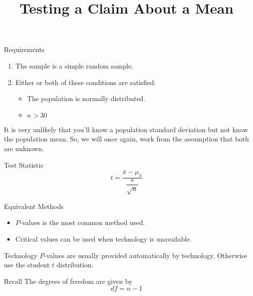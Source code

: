 \documentclass{beamer}
\title[MA205 - Section 8.3]{Testing a Claim About a Mean}
\begin{document}
\begin{frame}
\titlepage
\end{frame}

\begin{frame}
\begin{block}{Requirements}
\begin{enumerate}
\item The sample is a simple random sample.\pause
\item Either or both of these conditions are satisfied:
\begin{itemize}
\item The population is normally distributed.
\item $n>30$
\end{itemize}
\end{enumerate}
\end{block}\pause

\begin{note}
It is very unlikely that you'll know a population standard deviation but not know the population mean. So, we will once again, work from the assumption that both are unknown.
\end{note}\pause

\begin{block}{Test Statistic}
\begin{equation*}
t=\dfrac{\bar{x}-\mu_{\bar{x}}}{\dfrac{s}{\sqrt{n}}}
\end{equation*}
\end{block}
\end{frame}

\begin{frame}
\begin{block}{Equivalent Methods}
\begin{itemize}
\item $P$-values is the most common method used.\pause
\item Critical values can be used when technology is unavailable.
\end{itemize}
\end{block}\pause

\begin{block}{Technology}
$P$-values are usually provided automatically by technology. Otherwise use the student $t$ distribution.
\end{block}\pause

\begin{block}{Recall}
The degrees of freedom are given by
\begin{equation*}
df=n-1
\end{equation*}
\end{block}
\end{frame}
\end{document}
